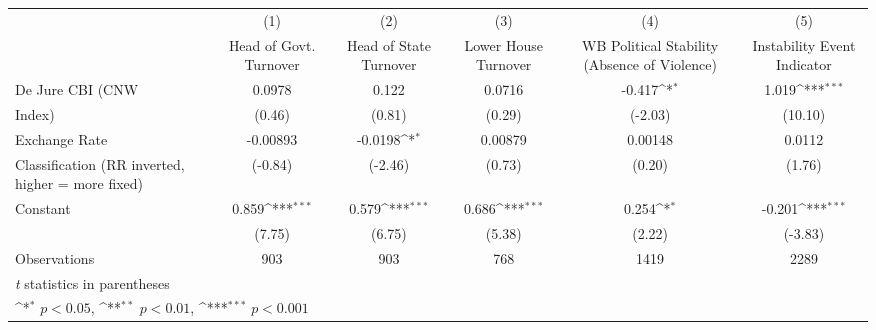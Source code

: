 {
\def\sym#1{\ifmmode^{#1}\else\(^{#1}\)\fi}
\begin{tabular}{l*{5}{c}}
\hline\hline
                    &\multicolumn{1}{c}{(1)}&\multicolumn{1}{c}{(2)}&\multicolumn{1}{c}{(3)}&\multicolumn{1}{c}{(4)}&\multicolumn{1}{c}{(5)}\\
                    &\multicolumn{1}{c}{Head of Govt. Turnover}&\multicolumn{1}{c}{Head of State Turnover}&\multicolumn{1}{c}{Lower House Turnover}&\multicolumn{1}{c}{WB Political Stability (Absence of Violence)}&\multicolumn{1}{c}{Instability Event Indicator}\\
\hline
De Jure CBI (CNW    &      0.0978         &       0.122         &      0.0716         &      -0.417\sym{*}  &       1.019\sym{***}\\
Index)              &      (0.46)         &      (0.81)         &      (0.29)         &     (-2.03)         &     (10.10)         \\
[1em]
Exchange Rate       &    -0.00893         &     -0.0198\sym{*}  &     0.00879         &     0.00148         &      0.0112         \\
Classification (RR inverted, higher = more fixed)&     (-0.84)         &     (-2.46)         &      (0.73)         &      (0.20)         &      (1.76)         \\
[1em]
Constant            &       0.859\sym{***}&       0.579\sym{***}&       0.686\sym{***}&       0.254\sym{*}  &      -0.201\sym{***}\\
                    &      (7.75)         &      (6.75)         &      (5.38)         &      (2.22)         &     (-3.83)         \\
\hline
Observations        &         903         &         903         &         768         &        1419         &        2289         \\
\hline\hline
\multicolumn{6}{l}{\footnotesize \textit{t} statistics in parentheses}\\
\multicolumn{6}{l}{\footnotesize \sym{*} \(p<0.05\), \sym{**} \(p<0.01\), \sym{***} \(p<0.001\)}\\
\end{tabular}
}
